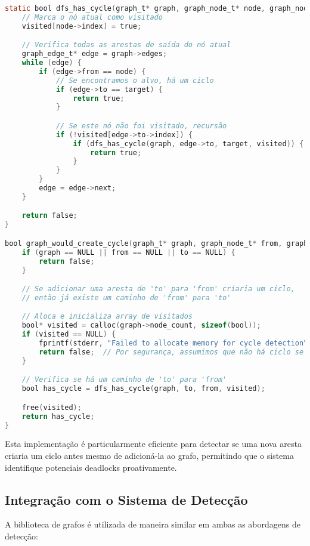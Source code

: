\begin{lstlisting}[language=C, caption={Algoritmo de detecção de ciclos usando DFS}]
static bool dfs_has_cycle(graph_t* graph, graph_node_t* node, graph_node_t* target, bool* visited) {
    // Marca o nó atual como visitado
    visited[node->index] = true;

    // Verifica todas as arestas de saída do nó atual
    graph_edge_t* edge = graph->edges;
    while (edge) {
        if (edge->from == node) {
            // Se encontramos o alvo, há um ciclo
            if (edge->to == target) {
                return true;
            }

            // Se este nó não foi visitado, recursão
            if (!visited[edge->to->index]) {
                if (dfs_has_cycle(graph, edge->to, target, visited)) {
                    return true;
                }
            }
        }
        edge = edge->next;
    }

    return false;
}

bool graph_would_create_cycle(graph_t* graph, graph_node_t* from, graph_node_t* to) {
    if (graph == NULL || from == NULL || to == NULL) {
        return false;
    }

    // Se adicionar uma aresta de 'to' para 'from' criaria um ciclo,
    // então já existe um caminho de 'from' para 'to'

    // Aloca e inicializa array de visitados
    bool* visited = calloc(graph->node_count, sizeof(bool));
    if (visited == NULL) {
        fprintf(stderr, "Failed to allocate memory for cycle detection\n");
        return false;  // Por segurança, assumimos que não há ciclo se não pudermos verificar
    }

    // Verifica se há um caminho de 'to' para 'from'
    bool has_cycle = dfs_has_cycle(graph, to, from, visited);

    free(visited);
    return has_cycle;
}
\end{lstlisting}

Esta implementação é particularmente eficiente para detectar se uma nova aresta criaria um ciclo antes mesmo de adicioná-la ao grafo, permitindo que o sistema identifique potenciais deadlocks proativamente.

\subsection{Integração com o Sistema de Detecção}

A biblioteca de grafos é utilizada de maneira similar em ambas as abordagens de detecção:

